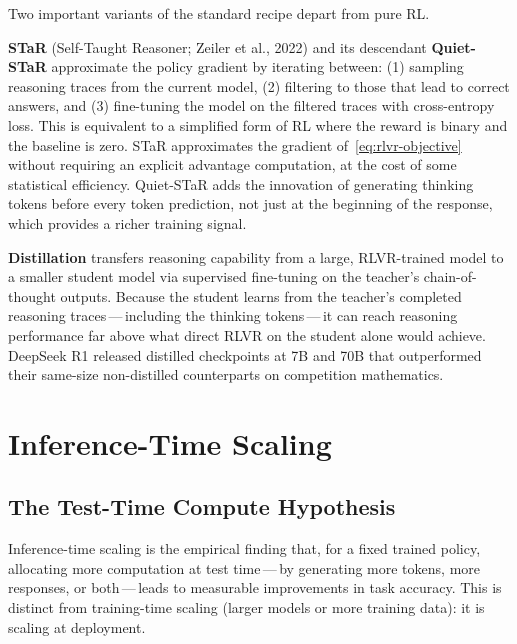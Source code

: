 Two important variants of the standard recipe depart from pure RL.

\textbf{STaR} (Self-Taught Reasoner; Zeiler et al., 2022)
and its descendant \textbf{Quiet-STaR} approximate
the policy gradient by iterating between: (1) sampling reasoning traces
from the current model, (2) filtering to those that lead to correct
answers, and (3) fine-tuning the model on the filtered traces with
cross-entropy loss. This is equivalent to a simplified form of RL where
the reward is binary and the baseline is zero. STaR approximates the
gradient of~\eqref{eq:rlvr-objective} without requiring an explicit
advantage computation, at the cost of some statistical efficiency.
Quiet-STaR adds the innovation of generating thinking tokens before
every token prediction, not just at the beginning of the response,
which provides a richer training signal.

\textbf{Distillation} transfers
reasoning capability from a large, RLVR-trained model to a smaller
student model via supervised fine-tuning on the teacher's
chain-of-thought outputs. Because the student learns from the teacher's
completed reasoning traces\,---\,including the thinking
tokens\,---\,it can reach reasoning performance far above what
direct RLVR on the student alone would achieve. DeepSeek R1 released
distilled checkpoints at 7B and 70B that outperformed their same-size
non-distilled counterparts on competition mathematics.

\section{Inference-Time Scaling}
\label{sec:inference-scaling}

\subsection{The Test-Time Compute Hypothesis}

Inference-time scaling is the
empirical finding that, for a fixed trained policy, allocating more
computation at test time\,---\,by generating more tokens, more
responses, or both\,---\,leads to measurable improvements in task
accuracy. This is distinct from training-time scaling (larger models
or more training data): it is scaling at deployment.

